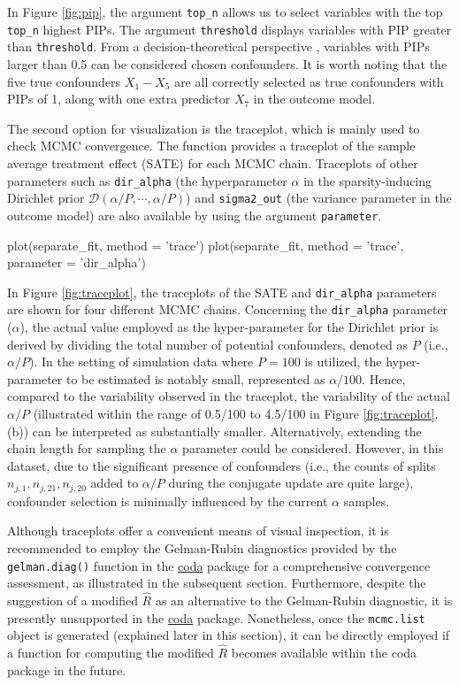 In Figure \ref{fig:pip}, the argument \verb|top_n| allows us to select variables with the top \verb|top_n| highest PIPs. The argument \verb|threshold| displays variables with PIP greater than \verb|threshold|. From a decision-theoretical perspective \citep{barbieri2004optimal, linero2018bayesian}, variables with PIPs larger than 0.5 can be considered chosen confounders. It is worth noting that the five true confounders $X_1-X_5$ are all correctly selected as true confounders with PIPs of 1, along with one extra predictor $X_7$ in the outcome model.

The second option for visualization is the traceplot, which is mainly used to check MCMC convergence. The function provides a traceplot of the sample average treatment effect (SATE) for each MCMC chain. Traceplots of other parameters such as \verb|dir_alpha| (the hyperparameter $\alpha$ in the sparsity-inducing Dirichlet prior $\mathcal{D}(\alpha/P, \cdots, \alpha/P)$) and \verb|sigma2_out| (the variance parameter in the outcome model) are also available by using the argument \verb|parameter|.

\begin{example}
plot(separate_fit, method = 'trace')
plot(separate_fit, method = 'trace', parameter = 'dir_alpha')
\end{example}

In Figure \ref{fig:traceplot}, the traceplots of the SATE and \verb|dir_alpha| parameters are shown for four different MCMC chains.
Concerning the \verb|dir_alpha| parameter ($\alpha$), the actual value employed as the hyper-parameter for the Dirichlet prior is derived by dividing the total number of potential confounders, denoted as $P$ (i.e., $\alpha /P$). In the setting of simulation data where $P=100$ is utilized, the hyper-parameter to be estimated is notably small, represented as $\alpha /100$. Hence, compared to the variability observed in the traceplot, the variability of the actual $\alpha /P$ (illustrated within the range of 0.5/100 to 4.5/100 in Figure \ref{fig:traceplot}.(b)) can be interpreted as substantially smaller. Alternatively, extending the chain length for sampling the $\alpha$ parameter could be considered. However, in this dataset, due to the significant presence of confounders (i.e., the counts of splits $n_{j,1}, n_{j,21}, n_{j,20}$ added to $\alpha/P$ during the conjugate update are quite large), confounder selection is minimally influenced by the current $\alpha$ samples.

Although traceplots offer a convenient means of visual inspection, it is recommended to employ the Gelman-Rubin diagnostics provided by the \verb|gelman.diag()| function in the \href{https://cran.r-project.org/package=coda}{coda} package \citep{CODA} for a comprehensive convergence assessment, as illustrated in the subsequent section. Furthermore, despite the suggestion of a modified $\hat{R}$ \citep{vehtari2021} as an alternative to the Gelman-Rubin diagnostic, it is presently unsupported in the \href{https://cran.r-project.org/package=coda}{coda} package. Nonetheless, once the \verb|mcmc.list| object is generated (explained later in this section), it can be directly employed if a function for computing the modified $\hat{R}$ becomes available within the coda package in the future.

